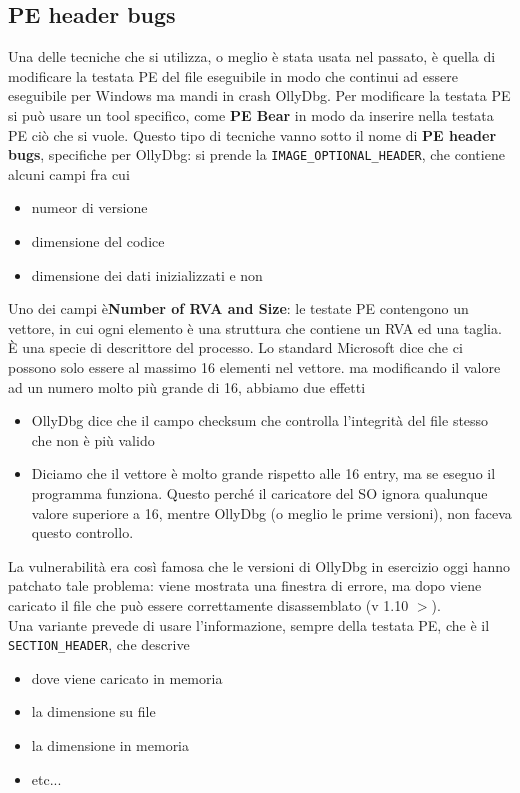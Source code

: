 \documentclass[12pt, oneside]{extbook}
\begin{document}
\subsection{PE header bugs}
Una delle tecniche che si utilizza, o meglio è stata usata nel passato, è quella di modificare la testata PE del file eseguibile in modo che continui ad essere eseguibile per Windows ma mandi in crash OllyDbg. Per modificare la testata PE si può usare un tool specifico, come \textbf{PE Bear} in modo da inserire nella testata PE ciò che si vuole. Questo tipo di tecniche vanno sotto il nome di \textbf{PE header bugs}, specifiche per OllyDbg: si prende la \texttt{IMAGE\_OPTIONAL\_HEADER}, che contiene alcuni campi fra cui
\begin{itemize}
\item numeor di versione
\item dimensione del codice
\item dimensione dei dati inizializzati e non
\end{itemize}
Uno dei campi è\textbf{Number of RVA and Size}: le testate PE contengono un vettore, in cui ogni elemento è una struttura che contiene un RVA ed una taglia. È una specie di descrittore del processo. Lo standard Microsoft dice che ci possono solo essere al massimo 16 elementi nel vettore. ma modificando il valore ad un numero molto più grande di 16, abbiamo due effetti
\begin{itemize}
\item OllyDbg dice che il campo checksum che controlla l'integrità del file stesso che non è più valido
\item Diciamo che il vettore è molto grande rispetto alle 16 entry, ma se eseguo il programma funziona. Questo perché il caricatore del SO ignora qualunque valore superiore a 16, mentre OllyDbg (o meglio le prime versioni), non faceva questo controllo.
\end{itemize}
La vulnerabilità era così famosa che le versioni di OllyDbg in esercizio oggi hanno patchato tale problema: viene mostrata una finestra di errore, ma dopo viene caricato il file che può essere correttamente disassemblato (v 1.10 $>$).\\Una variante prevede di usare l'informazione, sempre della testata PE, che è il \texttt{SECTION\_HEADER}, che descrive
\begin{itemize}
\item dove viene caricato in memoria
\item la dimensione su file
\item la dimensione in memoria
\item etc...
\end{itemize} 
\end{document}
